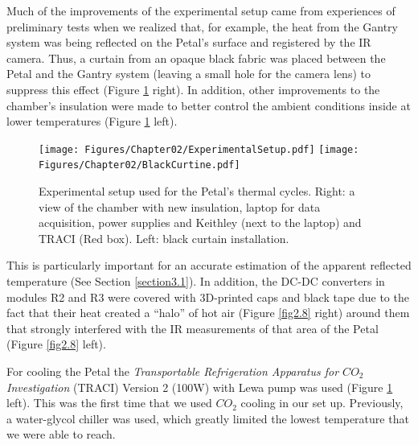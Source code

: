 		Much of the improvements of the experimental setup came from experiences of preliminary tests when we realized that, for example, the heat from the Gantry system was being reflected on the Petal’s surface and registered by the IR camera. Thus, a curtain from an opaque black fabric was placed between the Petal and the Gantry system (leaving a small hole for the camera lens) to suppress this effect (Figure \ref{fig2.7} right). In addition, other improvements to the chamber’s insulation were made to better control the ambient conditions inside at lower temperatures (Figure \ref{fig2.7} left). 
	
		\begin{figure}[ht!]
			\centering
			\captionsetup{justification=centering,margin=2cm}
			\texttt{[image: Figures/Chapter02/ExperimentalSetup.pdf]}
			\texttt{[image: Figures/Chapter02/BlackCurtine.pdf]}
			\caption{Experimental setup used for the Petal’s thermal cycles. Right: a view of the chamber with new insulation, laptop for data acquisition, power supplies and Keithley (next to the laptop) and TRACI (Red box). Left: black curtain installation.}\label{fig2.7}
		\end{figure}
	
		This is particularly important for an accurate estimation of the apparent reflected temperature (See Section \ref{section3.1}). In addition, the DC-DC converters in modules R2 and R3 were covered with 3D-printed caps and black tape due to the fact that their heat created a “halo” of hot air (Figure \ref{fig2.8} right) around them that strongly interfered with the IR measurements of that area of the Petal (Figure \ref{fig2.8} left).
		
		For cooling the Petal the \textit{Transportable Refrigeration Apparatus for $CO_{2}$ Investigation} (TRACI) Version 2 (100W) with Lewa pump was used (Figure \ref{fig2.7} left). This was the first time that we used $CO_{2}$ cooling in our set up. Previously, a water-glycol chiller was used, which greatly limited the lowest temperature that we were able to reach.
	
